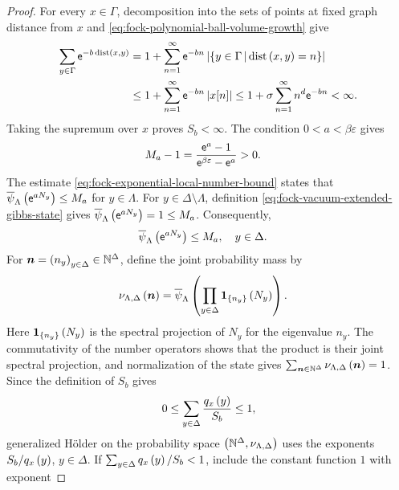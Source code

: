\documentclass[11pt,a4paper]{article}
\theoremstyle{plain}
\theoremstyle{definition}
\theoremstyle{remark}
\begin{document}
\begin{proof}
For every $x\in\Gamma$, decomposition into the sets of points at fixed graph distance from $x$ and
\eqref{eq:fock-polynomial-ball-volume-growth} give
$$\begin{aligned}
\sum_{y\in\Gamma}\mathsf{e}^{-b\operatorname{dist} \left( x,y \right)}
& =
1+
\sum_{n=1}^{\infty}
\mathsf{e}^{-bn}
\left| \left\{y\in\Gamma \, \middle| \, \operatorname{dist} \left( x,y \right)=n\right\} \right|
\\
& \leq
1+
\sum_{n=1}^{\infty}
\mathsf{e}^{-bn}\left| x[n] \right|
\leq
1+\sigma
\sum_{n=1}^{\infty}n^d\mathsf{e}^{-bn}
<
\infty.
\end{aligned}$$
Taking the supremum over $x$ proves $S_b<\infty$.
The condition $0<a<\beta\varepsilon$ gives
$$\begin{aligned}
M_a-1
& =
\frac{\mathsf{e}^a-1}
{\mathsf{e}^{\beta\varepsilon}-\mathsf{e}^a}
>
0.
\end{aligned}$$
The estimate \eqref{eq:fock-exponential-local-number-bound} states that
$\fun{\oastate[\overline{\psi}_{\Lambda}]}{\napiernum^{aN_y}}\leq M_a$ for $y\in\Lambda$.
For $y\in \Delta\setminus\Lambda$, definition
\eqref{eq:fock-vacuum-extended-gibbs-state} gives
$\fun{\oastate[\overline{\psi}_{\Lambda}]}{\napiernum^{aN_y}}=1\leq M_a$.
Consequently,
$$\begin{aligned}
\fun{\oastate[\overline{\psi}_{\Lambda}]}{\napiernum^{aN_y}}
& \leq
M_a,
\quad
y\in \Delta.
\end{aligned}$$
For $\boldsymbol{n}=\left( n_y \right)_{y\in \Delta}\in\mathbb{N}^{\Delta}$, define the joint probability mass by
$$\begin{aligned}
\fun{\nu_{\Lambda,\Delta}}{\boldsymbol{n}}
& =
\fun{\oastate[\overline{\psi}_{\Lambda}]}{
\prod_{y\in \Delta}\fun{\fndef{\setone{n_y}}}{N_y}}.
\end{aligned}$$
Here $\boldsymbol{1}_{\left\{ n_y \right\}} \left( N_y \right)$ is the spectral projection of $N_y$ for the eigenvalue $n_y$.
The commutativity of the number operators shows that the product is their joint spectral projection,
and normalization of the state gives
$\sum_{\boldsymbol{n}\in\mathbb{N}^{\Delta}}\nu_{\Lambda,\Delta} \left( \boldsymbol{n} \right)=1$.
Since the definition of $S_b$ gives
$$\begin{aligned}
0
\leq
\sum_{y\in \Delta}\frac{q_x \left( y \right)}{S_b}
\leq
1,
\end{aligned}$$
generalized Hölder on the probability space
$\left( \mathbb{N}^{\Delta},\nu_{\Lambda,\Delta} \right)$ uses the exponents
$S_b/q_x \left( y \right)$, $y\in \Delta$.
If $\sum_{y\in \Delta}q_x \left( y \right)/S_b<1$, include the constant function $1$ with exponent

\end{proof}
\end{document}

